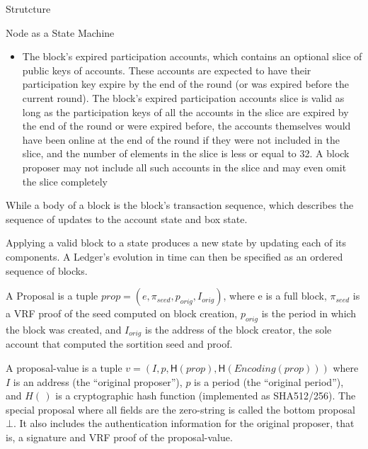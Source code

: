 \documentclass[10pt,a4paper]{article}
\begin{document}
\begin{section}{Strutcture}
\begin{subsection}{Node as a State Machine}
\begin{itemize}
    \item
    The block's expired participation accounts, which contains an optional slice
    of public keys of accounts. These accounts are expected to have their
    participation key expire by the end of the round (or was expired before
    the current round).
    The block's expired participation accounts slice is valid as long as the participation keys 
    of all the accounts in the slice are expired by the end of the round or
    were expired before, the accounts themselves would have been online at the end
    of the round if they were not included in the slice, and the number of elements
    in the slice is less or equal to 32. A block proposer may not include all such
    accounts in the slice and may even omit the slice completely
\end{itemize}
While a body of a block is the block's transaction sequence, which describes the sequence
of updates to the account state and box state. %
%


Applying a valid block to a state produces a new state by updating each of its components.
A Ledger's evolution in time can then be specified as an ordered sequence of blocks.

A Proposal is a tuple $prop = (e, \pi_{seed}, p_{orig}, I_{orig})$, where
e is a full block, $\pi_{seed}$ is a VRF proof of the seed computed
on block creation, $p_{orig}$ is the period in which the block was created,
and $I_{orig}$ is the address of the block creator, the sole account that
computed the sortition seed and proof.

A proposal-value is a tuple $v = (I, p, \mathsf{H}(prop), \mathsf{H}(Encoding(prop)))$ where 
$I$ is an address (the ``original proposer''), 
$p$ is a period (the ``original period''), 
and
$H(\,)$ is a cryptographic hash function (implemented as SHA512/256). 
The special proposal where all fields are the zero-string is called the bottom 
proposal $\bot$. 
It also includes the authentication information for the original proposer, that is, 
a signature and VRF proof of the proposal-value.


\end{subsection}
\end{section}
\end{document}
